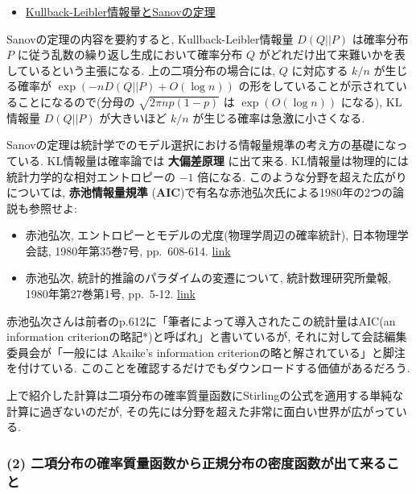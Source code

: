 \documentclass[
  letterpaper,
  DIV=11,
  numbers=noendperiod]{scrartcl}
\providecommand{\tightlist}{%
  \setlength{\itemsep}{0pt}\setlength{\parskip}{0pt}}\usepackage{longtable,booktabs,array}
\begin{document}
\begin{itemize}
\tightlist
\item
  \href{https://genkuroki.github.io/documents/20160616KullbackLeibler.pdf}{Kullback-Leibler情報量とSanovの定理}
\end{itemize}

Sanovの定理の内容を要約すると, Kullback-Leibler情報量 \(D(Q||P)\)
は確率分布 \(P\) に従う乱数の繰り返し生成において確率分布 \(Q\)
がどれだけ出て来難いかを表しているという主張になる.
上の二項分布の場合には, \(Q\) に対応する \(k/n\) が生じる確率が
\(\exp(-nD(Q||P)+O(\log n))\)
の形をしていることが示されていることになるので(分母の
\(\sqrt{2\pi np(1-p)}\) は \(\exp(O(\log n))\) になる), KL情報量
\(D(Q||P)\) が大きいほど \(k/n\) が生じる確率は急激に小さくなる.

Sanovの定理は統計学でのモデル選択における情報量規準の考え方の基礎になっている.
KL情報量は確率論では \textbf{大偏差原理} に出て来る.
KL情報量は物理的には統計力学的な相対エントロピーの \(-1\) 倍になる.
このような分野を超えた広がりについては, \textbf{赤池情報量規準}
(\textbf{AIC})で有名な赤池弘次氏による1980年の2つの論説も参照せよ:

\begin{itemize}
\tightlist
\item
  赤池弘次, エントロピーとモデルの尤度(物理学周辺の確率統計),
  日本物理学会誌, 1980年第35巻7号, pp.~608-614.
  \href{https://www.jstage.jst.go.jp/article/butsuri1946/35/7/35_7_608/_article/-char/ja/}{link}
\item
  赤池弘次, 統計的推論のパラダイムの変遷について, 統計数理研究所彙報,
  1980年第27巻第1号, pp.~5-12.
  \href{https://ismrepo.ism.ac.jp/index.php?active_action=repository_view_main_item_detail\&page_id=13\&block_id=21\&item_id=32568\&item_no=1}{link}
\end{itemize}

赤池弘次さんは前者のp.612に「筆者によって導入されたこの統計量はAIC(an
information criterionの略記*)と呼ばれ」と書いているが,
それに対して会誌編集委員会が「一般には Akaike's information
criterionの略と解されている」と脚注を付けている.
このことを確認するだけでもダウンロードする価値があるだろう.

上で紹介した計算は二項分布の確率質量函数にStirlingの公式を適用する単純な計算に過ぎないのだが,
その先には分野を超えた非常に面白い世界が広がっている.

\hypertarget{ux4e8cux9805ux5206ux5e03ux306eux78baux7387ux8ceaux91cfux51fdux6570ux304bux3089ux6b63ux898fux5206ux5e03ux306eux5bc6ux5ea6ux51fdux6570ux304cux51faux3066ux6765ux308bux3053ux3068}{%
\subsubsection{(2)
二項分布の確率質量函数から正規分布の密度函数が出て来ること}\label{ux4e8cux9805ux5206ux5e03ux306eux78baux7387ux8ceaux91cfux51fdux6570ux304bux3089ux6b63ux898fux5206ux5e03ux306eux5bc6ux5ea6ux51fdux6570ux304cux51faux3066ux6765ux308bux3053ux3068}}
\end{document}

